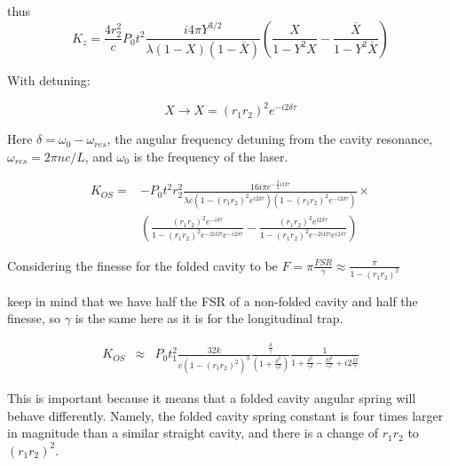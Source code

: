 thus 
\begin{equation}
K_z=\frac{4r_2^2}{c} P_0 t^2 \frac{i 4\pi Y^{3/2}}{\lambda(1-X)(1-\overline{X})}\left(\frac{X}{1-Y^2X}-\frac{\overline{X}}{1-Y^2\overline{X}}\right)
\label{eq:Kz}
\end{equation}

With detuning:

\begin{equation}
X \rightarrow X=(r_1r_2)^2 e^{-i2\delta\tau}
\label{e:Xdet}
\end{equation}

Here $\delta = \omega_0-\omega_{res}$, the angular frequency detuning from the cavity resonance, $\omega_{res} = 2\pi n c/L$, and $\omega_0$ is the frequency of the laser.

\begin{eqnarray}
K_{OS}=&-P_0 t^2 r_2^2 \frac{16i\pi e^{-\frac{3}{2}i\Omega\tau}}{\lambda c(1-(r_1r_2)^2e^{i2\delta\tau})(1-(r_1r_2)^2e^{-i2\delta\tau})}\times\nonumber\\
 & \left( \frac{(r_1r_2)^2e^{-i\delta \tau}}{1-(r_1r_2)^2e^{-2i\Omega\tau} e^{-i2\delta\tau}}
 -\frac{(r_1r_2)^2e^{i2\delta\tau}}{1-(r_1r_2)^2e^{-2i\Omega\tau}e^{i2\delta\tau}} \right) 
\end{eqnarray}

Considering the finesse for the folded cavity to be $F = \pi\frac{FSR}{\gamma} \approx \frac{\pi}{1-(r_1r_2)^2} $

keep in mind that we have half the FSR of a non-folded cavity and half the finesse, so $\gamma$ is the same here as it is for the longitudinal trap.

\begin{eqnarray}
\label{eq:KOSfold}
K_{OS} & {\approx} & P_0 t_1^2 \frac{32k}{c(1-(r_1r_2)^2)^3}\frac{ \frac{\delta}{\gamma}}{(1+\frac{\delta^2}{\gamma^2})} 
\frac{1}{1+\frac{\delta^2}{\gamma^2}-\frac{\Omega^2}{\gamma^2}+i2\frac{\Omega}{\gamma} }
\end{eqnarray}

This is important because it means that a folded cavity angular spring will behave differently. Namely, the folded cavity spring constant is four times larger in magnitude than a similar straight cavity, and there is a change of $r_1r_2$ to $(r_1r_2)^2$.

